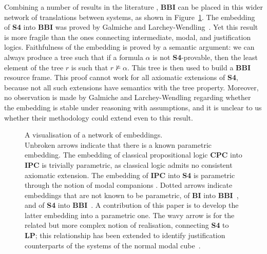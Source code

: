 \documentclass[a4paper]{article}
\newcommand{\BBI}{\textbf{BBI}\xspace}
\newcommand{\SFour}{\textbf{S4}\xspace}
\begin{document}
Combining a number of results in the literature \cite{chagrov_modal_1992, artemov2019justification, embedding_BI_into_BBI, galmiche_expressivity_2006}, \BBI can be placed in this wider network of translations between systems, as shown in Figure~\ref{fig:embeddings}. The embedding of \SFour into \BBI was proved by Galmiche and Larchey-Wendling~\cite{galmiche_expressivity_2006}. Yet this result is more fragile than the ones connecting intermediate, modal, and justification logics. Faithfulness of the embedding is proved \cite{galmiche_expressivity_2006} by a semantic argument: we can always produce a tree such that if a formula $\alpha$ is not \SFour-provable, then the least element of the tree $r$ is such that $r\nvDash \alpha$. This tree is then used to build a \textbf{BBI} resource frame. This proof cannot work for all axiomatic extensions of \textbf{S4}, because not all such extensions have semantics with the tree property. Moreover, no observation is made by Galmiche and Larchey-Wendling regarding whether the embedding is stable under reasoning with assumptions, and it is unclear to us whether their methodology could extend even to this result.

\begin{figure}[t]
\centering
{}
\caption{A visualisation of a network of embeddings. \\
\footnotesize Unbroken arrows indicate that there is a known parametric embedding. The embedding of classical propositional logic \textbf{CPC} into \textbf{IPC} is trivially parametric, as classical logic admits no consistent axiomatic extension. The embedding of \textbf{IPC} into \SFour is parametric through the notion of modal companions \cite{chagrov_modal_1992}. Dotted arrows indicate embeddings that are not known to be parametric, of \textbf{BI} into \BBI~\cite{embedding_BI_into_BBI}, and of \SFour into \BBI~\cite{galmiche_expressivity_2006}. A contribution of this paper is to develop the latter embedding into a parametric one. The wavy arrow is for the related but more complex notion of realisation, connecting \SFour to \textbf{LP}; this relationship has been extended to identify justification counterparts of the systems of the normal modal cube~\cite{artemov2019justification, borg2015realization}.}
\label{fig:embeddings}
\end{figure}
\end{document}
